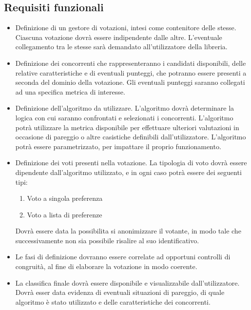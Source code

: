 \documentclass[12pt,a4paper,openright,twoside]{book}
\begin{document}
    \subsection{Requisiti funzionali}
    \begin{itemize}
        \item{Definizione di un gestore di votazioni, intesi come contenitore delle stesse. Ciascuna votazione
        dovrà essere indipendente dalle altre. L'eventuale collegamento tra le stesse sarà demandato all'utilizzatore della libreria.}
        \item{Definizione dei concorrenti che rappresenteranno i candidati disponibili, delle relative caratteristiche e di
        eventuali punteggi, che potranno essere presenti a seconda del dominio della votazione.
        Gli eventuali punteggi saranno collegati ad una specifica metrica di interesse.
        }
        \item{Definizione dell'algoritmo da utilizzare. L'algoritmo dovrà determinare la logica con cui saranno
        confrontati e selezionati i concorrenti. L'algoritmo potrà utilizzare la metrica disponibile per
        effettuare ulteriori valutazioni in occasione di pareggio o altre casistiche definibili dall'utilizzatore.
        L'algoritmo potrà essere parametrizzato, per impattare il proprio funzionamento.   }
        \item{Definizione dei voti presenti nella votazione. La tipologia di voto dovrà essere dipendente dall'algoritmo utilizzato,
        e in ogni caso potrà essere dei seguenti tipi:
        \begin{enumerate}
            \label{tipidivoto}
            \item{Voto a singola preferenza}
            \item{Voto a lista di preferenze}
        \end{enumerate}

        Dovrà essere data la possibilita si anonimizzare il votante, in modo tale che successivamente non sia possibile risalire al suo identificativo.

        
        }
        \item{Le fasi di definizione dovranno essere correlate ad opportuni controlli di congruità, al fine di elaborare la votazione in modo coerente.}
        \item{La classifica finale dovrà essere disponibile e visualizzabile dall'utilizzatore. Dovrà esser data evidenza
        di eventuali situazioni di pareggio, di quale algoritmo è stato utilizzato e delle caratteristiche dei concorrenti.}
    \end{itemize}
\end{document}
